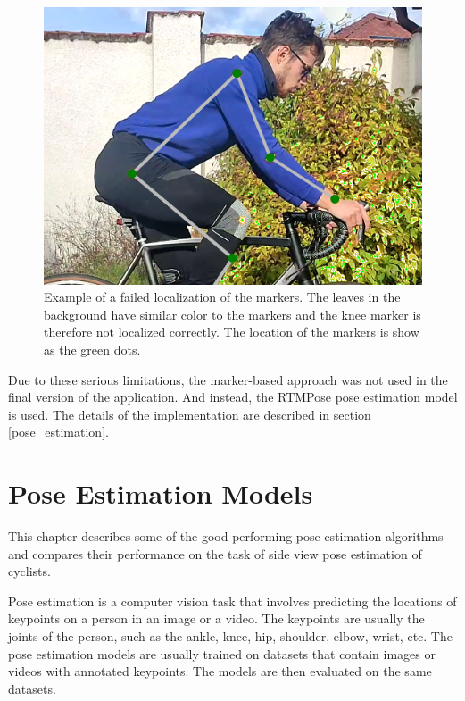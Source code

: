 \begin{figure}[htbp]
    \centering
    \includegraphics[width=\textwidth]{obrazky-figures/failed_localization_crop.png}
    \caption{Example of a failed localization of the markers. The leaves in the background have similar color to the markers and the knee marker is therefore not localized correctly. The location of the markers is show as the green dots.}
    \label{fig:failed_localization}
\end{figure}

Due to these serious limitations, the marker-based approach was not used in the final version of the application. And instead, the RTMPose pose estimation model is used. The details of the implementation are described in section \ref{pose_estimation}.




\chapter{Pose Estimation Models}
\label{ch:pose_estimation}

This chapter describes some of the good performing pose estimation algorithms and compares their performance on the task of side view pose estimation of cyclists.

Pose estimation is a computer vision task that involves predicting the locations of keypoints on a person in an image or a video. The keypoints are usually the joints of the person, such as the ankle, knee, hip, shoulder, elbow, wrist, etc. The pose estimation models are usually trained on datasets that contain images or videos with annotated keypoints. The models are then evaluated on the same datasets.

